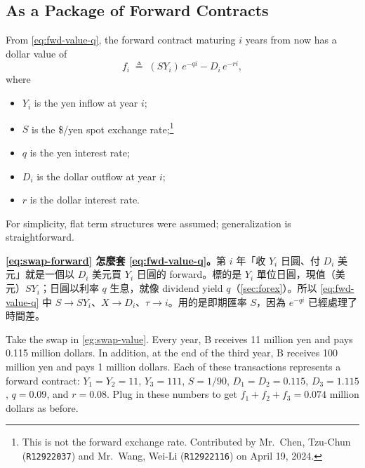 \subsection{As a Package of Forward Contracts}


From \eqref{eq:fwd-value-q}, the forward contract maturing $i$ years from now has a dollar value of
\begin{equation}
	f_{i} \;\triangleq\; (SY_{i})\,e^{-qi}-D_{i}\,e^{-ri} ,
	\label{eq:swap-forward}
\end{equation}
where
\begin{itemize}[nosep]
	\item $Y_{i}$ is the yen inflow at year $i$;
	\item $S$ is the \$/yen spot exchange rate;\footnote{This is not the forward exchange rate. Contributed by Mr.~Chen, Tzu-Chun (\texttt{R12922037}) and Mr.~Wang, Wei-Li (\texttt{R12922116}) on April 19, 2024.}
	\item $q$ is the yen interest rate;
	\item $D_{i}$ is the dollar outflow at year $i$;
	\item $r$ is the dollar interest rate.
\end{itemize}
For simplicity, flat term structures were assumed; generalization is straightforward.

\suppstart
{}

\begin{remark}
	\textbf{\eqref{eq:swap-forward} 怎麼套 \eqref{eq:fwd-value-q}。}第 $i$ 年「收 $Y_{i}$ 日圓、付 $D_{i}$ 美元」就是一個以 $D_{i}$ 美元買 $Y_{i}$ 日圓的 forward。標的是 $Y_{i}$ 單位日圓，現值（美元）$SY_{i}$；日圓以利率 $q$ 生息，就像 dividend yield $q$（\autoref{sec:forex}）。所以 \eqref{eq:fwd-value-q} 中 $S\to SY_{i}$、$X\to D_{i}$、$\tau\to i$。用的是即期匯率 $S$，因為 $e^{-qi}$ 已經處理了時間差。
\end{remark}
\suppend

\begin{eg}
	Take the swap in \autoref{eg:swap-value}.
	Every year, B receives 11 million yen and pays 0.115 million dollars.
	In addition, at the end of the third year, B receives 100 million yen and pays 1 million dollars.
	Each of these transactions represents a forward contract:
	$Y_{1}=Y_{2}=11$, $Y_{3}=111$, $S=1/90$, $D_{1}=D_{2}=0.115$, $D_{3}=1.115$, $q=0.09$, and $r=0.08$.
	Plug in these numbers to get $f_{1}+f_{2}+f_{3}=0.074$ million dollars as before.
\end{eg}

